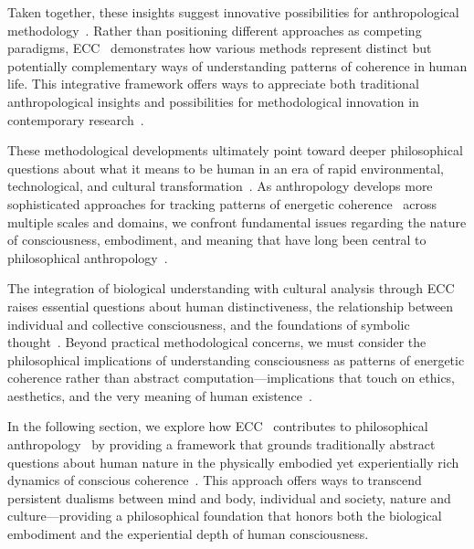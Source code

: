 Taken together, these insights suggest innovative possibilities for anthropological methodology~\cite{strathern2004partial, latour2005reassembling}. Rather than positioning different approaches as competing paradigms, ECC~ demonstrates how various methods represent distinct but potentially complementary ways of understanding patterns of coherence in human life. This integrative framework offers ways to appreciate both traditional anthropological insights and possibilities for methodological innovation in contemporary research~\cite{fischer2018anthropology, pink2016digital}.

These methodological developments ultimately point toward deeper philosophical questions about what it means to be human in an era of rapid environmental, technological, and cultural transformation~\cite{rabinow2008marking, Heidegger1962}. As anthropology develops more sophisticated approaches for tracking patterns of energetic coherence~ across multiple scales and domains, we confront fundamental issues regarding the nature of consciousness, embodiment, and meaning that have long been central to philosophical anthropology~\cite{Cassirer1944, Husserl1991}.

The integration of biological understanding with cultural analysis through ECC~ raises essential questions about human distinctiveness, the relationship between individual and collective consciousness, and the foundations of symbolic thought~\cite{Bruner1990, McGilchrist2019}. Beyond practical methodological concerns, we must consider the philosophical implications of understanding consciousness as patterns of energetic coherence rather than abstract computation---implications that touch on ethics, aesthetics, and the very meaning of human existence~\cite{Taylor1991, Camus1955}.

In the following section, we explore how ECC~ contributes to philosophical anthropology~ by providing a framework that grounds traditionally abstract questions about human nature in the physically embodied yet experientially rich dynamics of conscious coherence~\cite{Sartre1956, Ricoeur1984}. This approach offers ways to transcend persistent dualisms between mind and body, individual and society, nature and culture---providing a philosophical foundation that honors both the biological embodiment and the experiential depth of human consciousness.

